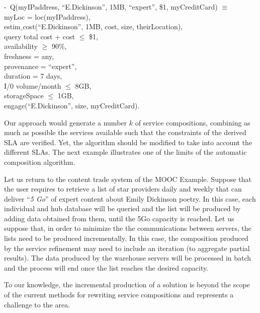 \begin{footnotesize}
\sf
\begin{tabbing}
 -~Q(myIPad\=dress, ``E.Dickinson'', 1MB, ``expert'', \$1, myCreditCard) $\equiv$ \\
 \>  myLoc = loc(myIPaddress), \\
 \>  estim$\_$cost(``E.Dickinson'', 1MB, cost, size, theirLocation), \\
 \>  query total cost + cost $\leq$ \$1,\\
 \>  availability $\geq$ 90$\%$, \\
 \>  freshness = any, \\
 \>  provenance = ``expert'', \\
 \>  duration = 7 days, \\
 \>  I/0 volume/month $\leq$ 8GB, \\
 \>  storageSpace $\leq$ 1GB, \\
 \>  engage(``E.Dickinson'', size, myCreditCard).
 \end{tabbing} 
\end{footnotesize}

Our approach would generate a number $k$ of service compositions, combining as much as possible the services available such that the constraints of the derived SLA are verified. 
 Yet, the algorithm should be modified to take into account the different SLAs. The next example illustrates one of the limits of the automatic composition algorithm.

\begin{example}\label{Ex:rew2}
Let us return to the content  trade system of the MOOC Example.
 Suppose that the user requires to retrieve a list of star providers  daily and weekly that can deliver ``\textit{5 Go}'' of expert content about Emily Dickinson poetry.
In this case, each individual and hub database will be queried and the list will be produced by adding data obtained from them, until the 5Go  capacity is reached.
Let us suppose that, in order to minimize the the communications between servers, the lists need to be produced incrementally.
In this case, the composition produced by the service refinement may need to include an iteration (to aggregate partial results). 
The data produced by the warehouse servers will be processed in batch and the process will end once the list reaches the desired capacity.

To our knowledge, the incremental production of a solution is beyond  the scope of the current methods for rewriting service compositions and represents a challenge to the area.
~\hfill\openbox
\end{example}


